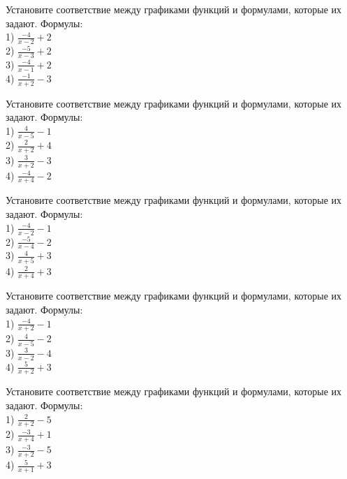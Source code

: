 \documentclass[4apaper]{article}
\begin{document}
\begin{taskBN}{86}
Установите соответствие между графиками функций и формулами, которые их задают. Формулы: \\1) $\frac{-4}{x-2}+2$\\2) $\frac{-5}{x-3}+2$\\3) $\frac{-4}{x-1}+2$\\4) $\frac{-1}{x+2}-3$
\end{taskBN}

\begin{taskBN}{87}
Установите соответствие между графиками функций и формулами, которые их задают. Формулы: \\1) $\frac{4}{x-5}-1$\\2) $\frac{2}{x+2}+4$\\3) $\frac{3}{x+2}-3$\\4) $\frac{-4}{x+4}-2$
\end{taskBN}

\begin{taskBN}{88}
Установите соответствие между графиками функций и формулами, которые их задают. Формулы: \\1) $\frac{-4}{x-2}-1$\\2) $\frac{-5}{x-4}-2$\\3) $\frac{4}{x+5}+3$\\4) $\frac{2}{x+4}+3$
\end{taskBN}

\begin{taskBN}{89}
Установите соответствие между графиками функций и формулами, которые их задают. Формулы: \\1) $\frac{-4}{x+2}-1$\\2) $\frac{4}{x-5}-2$\\3) $\frac{3}{x-2}-4$\\4) $\frac{5}{x+2}+3$
\end{taskBN}

\begin{taskBN}{90}
Установите соответствие между графиками функций и формулами, которые их задают. Формулы: \\1) $\frac{2}{x+2}-5$\\2) $\frac{-3}{x+4}+1$\\3) $\frac{-3}{x+2}-5$\\4) $\frac{5}{x+1}+3$
\end{taskBN}
\end{document}
